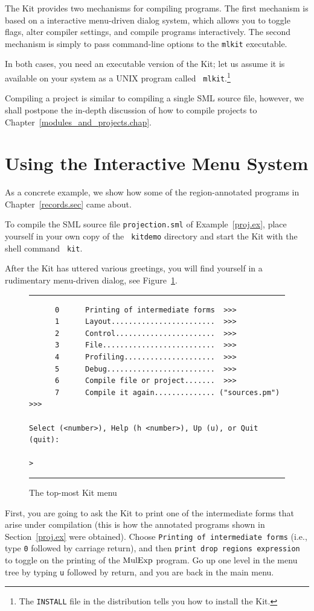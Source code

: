 \documentclass[12pt]{book}
\begin{document}
The Kit provides two mechanisms for compiling programs. The first
mechanism is based on a
%
interactive menu-driven dialog system, which allows you to toggle
flags, alter compiler settings, and compile programs interactively.
The second mechanism is simply to pass
%
command-line options to the {\tt mlkit} executable.

In both cases, you need an executable version of the Kit; let us
assume it is available on your system as a UNIX program called {\tt
  mlkit}.\footnote{The {\tt INSTALL} file in the distribution tells you
  how to install the Kit.}

Compiling a project is similar to compiling a single SML source file,
however, we shall postpone the in-depth discussion of how to compile
projects to Chapter~\ref{modules_and_projects.chap}.

\section{Using the Interactive Menu System}

As a concrete example, we show how some of the region-annotated
programs in Chapter~\ref{records.sec} came about.

To compile the SML source file {\tt projection.sml} of
Example~\ref{proj.ex}, place yourself in your own copy of the {\tt
  kitdemo} directory and start the Kit with the shell command {\tt
  kit}.

After the Kit has uttered various greetings, you will find yourself in
a rudimentary menu-driven dialog, see Figure~\ref{dialogue.fig}.
\begin{figure}
\hrule \medskip
\begin{verbatim}
      0      Printing of intermediate forms  >>>
      1      Layout........................  >>>
      2      Control.......................  >>>
      3      File..........................  >>>
      4      Profiling.....................  >>>
      5      Debug.........................  >>>
      6      Compile file or project.......  >>>
      7      Compile it again.............. ("sources.pm") >>>

Select (<number>), Help (h <number>), Up (u), or Quit (quit): 

>
\end{verbatim}
\caption{The top-most Kit menu}
\medskip \hrule 
\label{dialogue.fig}
\end{figure}
First, you are going to ask the Kit to print one of the intermediate
forms that arise under compilation (this is how the annotated programs
shown in  Section~\ref{proj.ex} were obtained). 
Choose \texttt{Printing of intermediate forms} (i.e., type \texttt{0}
followed by carriage return), and then \texttt{print drop regions
expression} to toggle on the printing of the $\hbox{\rm MulExp}$ program.
Go up one level in the menu tree by typing \texttt{u} followed by return,
and you are back in the main menu.
\end{document}

